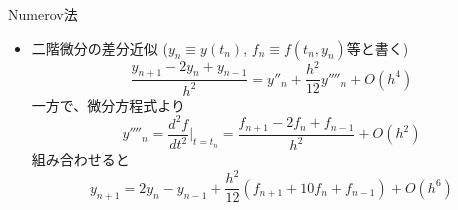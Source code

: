 \begin{frame}[t,fragile]{Numerov法}
  \begin{itemize}
  \item 二階微分の差分近似 ($y_n \equiv y(t_n)$, $f_n \equiv f(t_n, y_n)$等と書く)
    \[
    \frac{y_{n+1} - 2 y_n + y_{n-1}}{h^2} = y''_{n} + \frac{h^2}{12} y''''_{n} + O(h^4)
    \]
  一方で、微分方程式より
    \[
    y''''_n = \frac{d^2f}{dt^2}\Big|_{t=t_n} = \frac{f_{n+1}-2f_n+f_{n-1}}{h^2} + O(h^2)
    \]
    組み合わせると
    \[
    y_{n+1} = 2y_n - y_{n-1} + \frac{h^2}{12} (f_{n+1} + 10f_{n} + f_{n-1}) + O(h^6)
    \]
  \end{itemize}
\end{frame}
